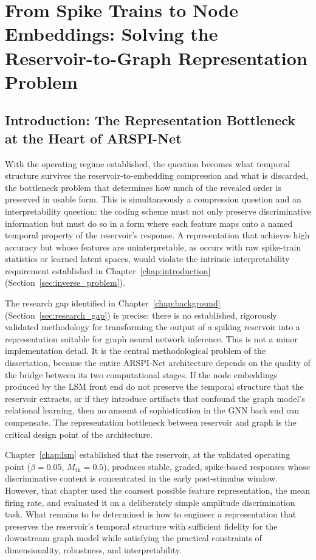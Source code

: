 \chapter{From Spike Trains to Node Embeddings: Solving the Reservoir-to-Graph Representation Problem}
\label{chap:embeddings}

\section{Introduction: The Representation Bottleneck at the Heart of ARSPI-Net}
\label{sec:ch4_intro}

With the operating regime established, the question becomes what temporal structure survives the reservoir-to-embedding compression and what is discarded, the bottleneck problem that determines how much of the revealed order is preserved in usable form. This is simultaneously a compression question and an interpretability question: the coding scheme must not only preserve discriminative information but must do so in a form where each feature maps onto a named temporal property of the reservoir's response. A representation that achieves high accuracy but whose features are uninterpretable, as occurs with raw spike-train statistics or learned latent spaces, would violate the intrinsic interpretability requirement established in Chapter~\ref{chap:introduction} (Section~\ref{sec:inverse_problem}).

The research gap identified in Chapter~\ref{chap:background} (Section~\ref{sec:research_gap}) is precise: there is no established, rigorously validated methodology for transforming the output of a spiking reservoir into a representation suitable for graph neural network inference. This is not a minor implementation detail. It is the central methodological problem of the dissertation, because the entire ARSPI-Net architecture depends on the quality of the bridge between its two computational stages. If the node embeddings produced by the LSM front end do not preserve the temporal structure that the reservoir extracts, or if they introduce artifacts that confound the graph model's relational learning, then no amount of sophistication in the GNN back end can compensate. The representation bottleneck between reservoir and graph is the critical design point of the architecture.

Chapter~\ref{chap:lsm} established that the reservoir, at the validated operating point ($\beta = 0.05$, $M_{\text{th}} = 0.5$), produces stable, graded, spike-based responses whose discriminative content is concentrated in the early post-stimulus window. However, that chapter used the coarsest possible feature representation, the mean firing rate, and evaluated it on a deliberately simple amplitude discrimination task. What remains to be determined is how to engineer a representation that preserves the reservoir's temporal structure with sufficient fidelity for the downstream graph model while satisfying the practical constraints of dimensionality, robustness, and interpretability.


